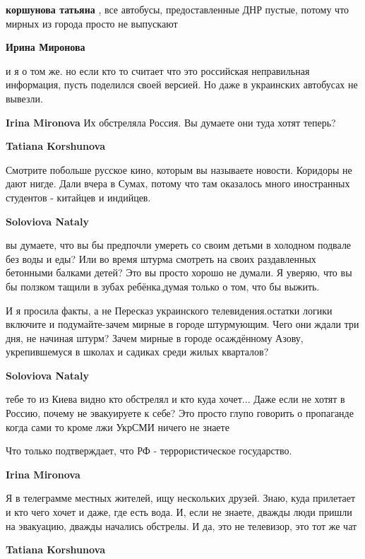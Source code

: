 \begin{itemize}
\begin{itemize} %
\textbf{коршунова татьяна} , все автобусы, предоставленные ДНР пустые, потому что мирных из города просто не выпускают

\textbf{Ирина Миронова} 

и я о том же. но если кто то считает что это российская неправильная
информация, пусть поделился своей версией. Но даже в украинских автобусах не
вывезли.

\textbf{Irina Mironova} Их обстреляла Россия. Вы думаете они туда хотят теперь?

\textbf{Tatiana Korshunova} 

Смотрите побольше русское кино, которым вы называете новости. Коридоры не дают
нигде. Дали вчера в Сумах, потому что там оказалось много иностранных студентов
- китайцев и индийцев.

\textbf{Soloviova Nataly} 

вы думаете, что вы бы предпочли умереть со своим детьми в холодном подвале без
воды и еды? Или во время штурма смотреть на своих раздавленных бетонными
балками детей? Это вы просто хорошо не думали. Я уверяю, что вы бы ползком
тащили в зубах ребёнка,думая только о том, что бы выжить.

И я просила факты, а не Пересказ украинского телевидения.остатки логики
включите и подумайте-зачем мирные в городе штурмующим. Чего они ждали три дня,
не начиная штурм? Зачем мирные в городе осаждённому Азову, укрепившемуся в
школах и садиках среди жилых кварталов?

\textbf{Soloviova Nataly} 

тебе то из Киева видно кто обстрелял и кто куда хочет... Даже если не хотят в
Россию, почему не эвакуируете к себе? Это просто глупо говорить о пропаганде
когда сами то кроме лжи УкрСМИ ничего не знаете

Что только подтверждает, что РФ - террористическое государство.

\textbf{Irina Mironova} 

Я в телеграмме местных жителей, ищу нескольких друзей. Знаю, куда прилетает и
кто чего хочет и даже, где есть вода. И, если не знаете, дважды люди пришли на
эвакуацию, дважды начались обстрелы. И да, это не телевизор, это тот же чат

\textbf{Tatiana Korshunova} 


\end{itemize}
\end{itemize}
